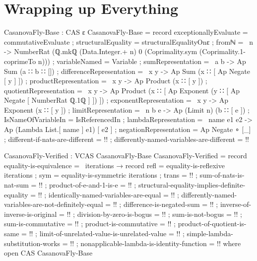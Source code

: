 \documentclass{report}
\begin{document}
\chapter{Wrapping up Everything}

\begin{code}
CasanovaFly-Base : CAS ε
CasanovaFly-Base = record
  { exceptionallyEvaluate = commutativeEvaluate
  ; structuralEquality = structuralEqualityOnε
  ; fromℕ = \ n ->
      NumberRat (ℚ.mkℚ (Data.Integer.+ n)
                       0
                       (Coprimality.sym (Coprimality.1-coprimeTo n)))
  ; variableNamed = Variable
  ; sumRepresentation = \ a b -> Ap Sum (a ∷ b ∷ [])
  ; differenceRepresentation = \ x y -> Ap Sum (x ∷ [ Ap Negate [ y ] ])
  ; productRepresentation = \ x y -> Ap Product (x ∷ [ y ])
  ; quotientRepresentation = \ x y ->
     Ap Product (x ∷ [ Ap Exponent (y ∷ [ Ap Negate [ NumberRat ℚ.1ℚ ] ]) ])
  ; exponentRepresentation = \ x y -> Ap Exponent (x ∷ [ y ])
  ; limitRepresentation = \ n b e -> Ap (Limit n) (b ∷ [ e ])
  ; IsNameOfVariableIn = IsReferencedIn
  ; lambdaRepresentation = \ name e1 e2 -> Ap (Lambda List.[ name ] e1) [ e2 ]
  ; negationRepresentation = Ap Negate ∘ [_]
  ; different-if-nats-are-different = {!!}
  ; differently-named-variables-are-different = {!!}
  }

CasanovaFly-Verified : VCAS CasanovaFly-Base
CasanovaFly-Verified = record
  { equality-is-equivalence = \ iterations → record
    { refl = equality-is-reflexive iterations
    ; sym = equality-is-symmetric iterations
    ; trans = {!!}
    }
  ; sum-of-nats-is-nat-sum = {!!}
  ; product-of-e-and-1-is-e = {!!}
  ; structural-equality-implies-definite-equality = {!!}
  ; identically-named-variables-are-equal = {!!}
  ; differently-named-variables-are-not-definitely-equal = {!!}
  ; difference-is-negated-sum = {!!}
  ; inverse-of-inverse-is-original = {!!}
  ; division-by-zero-is-bogus = {!!}
  ; sum-is-not-bogus = {!!}
  ; sum-is-commutative = {!!}
  ; product-is-commutative = {!!}
  ; product-of-quotient-is-same = {!!}
  ; limit-of-unrelated-value-is-unrelated-value = {!!}
  ; simple-lambda-substitution-works = {!!}
  ; nonapplicable-lambda-is-identity-function = {!!}
  }
  where
  open CAS CasanovaFly-Base


\end{code}
\end{document}
